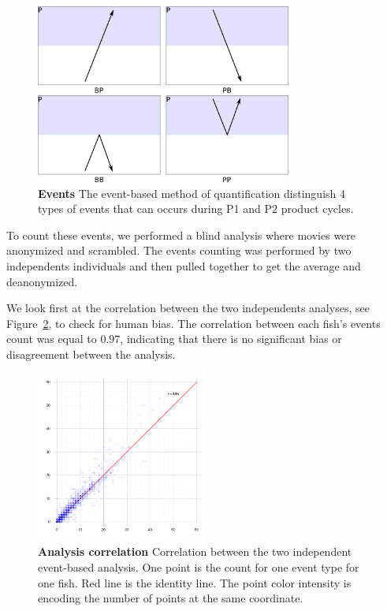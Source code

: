     \begin{figure}[h]
      \centering
      \includegraphics[width=0.75\textwidth]{part_2/assets/events.png}
      \caption{\textbf{Events} The event-based method of quantification distinguish 4 types of events that can occurs during P1 and P2 product cycles.}
      \label{events}
    \end{figure}

  To count these events, we performed a blind analysis where movies were anonymized and scrambled. The events counting was performed by two independents individuals and then pulled together to get the average and deanonymized.

  We look first at the correlation between the two independents analyses, see Figure~\ref{correlation_count}, to check for human bias. The correlation between each fish's events count was equal to $0.97$, indicating that there is no significant bias or disagreement between the analysis.

    \begin{figure}[h]
      \centering
      \includegraphics[width=0.50\textwidth]{part_2/assets/correlation.png}
      \caption{\textbf{Analysis correlation} Correlation between the two independent event-based analysis. One point is the count for one event type for one fish. Red line is the identity line. The point color intensity is encoding the number of points at the same coordinate.}
      \label{correlation_count}
    \end{figure}

